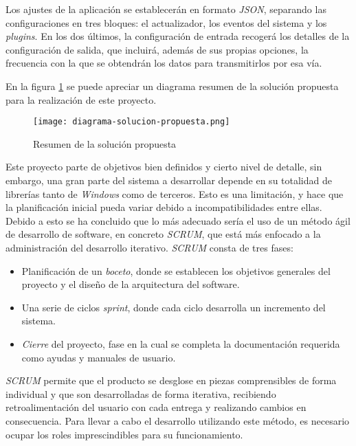     Los ajustes de la aplicación se establecerán en formato \textit{JSON}, separando las configuraciones en tres bloques: el actualizador, los eventos del sistema y los \textit{plugins}. En los dos últimos, la configuración de entrada recogerá los detalles de la configuración de salida, que incluirá, además de sus propias opciones, la frecuencia con la que se obtendrán los datos para transmitirlos por esa vía.
    
    En la figura \ref{fig:proposed-solution-diagram} se puede apreciar un diagrama resumen de la solución propuesta para la realización de este proyecto.
    
    \begin{figure}[h!]
    \centering
        \texttt{[image: diagrama-solucion-propuesta.png]}
        \caption{Resumen de la solución propuesta}
        \label{fig:proposed-solution-diagram}
    \end{figure}
    
    Este proyecto parte de objetivos bien definidos y cierto nivel de detalle, sin embargo, una gran parte del sistema a desarrollar depende en su totalidad de librerías tanto de \textit{Windows} como de terceros. Esto es una limitación, y hace que la planificación inicial pueda variar debido a incompatibilidades entre ellas. Debido a esto se ha concluido que lo más adecuado sería el uso de un método ágil de desarrollo de software, en concreto \textit{SCRUM}, que está más enfocado a la administración del desarrollo iterativo. \textit{SCRUM} consta de tres fases:
        
    \begin{itemize}
        \item Planificación de un \textit{boceto}, donde se establecen los objetivos generales del proyecto y el diseño de la arquitectura del software.
        
        \item Una serie de ciclos \textit{sprint}, donde cada ciclo desarrolla un incremento del sistema.
        
        \item \textit{Cierre} del proyecto, fase en la cual se completa la documentación requerida como ayudas y manuales de usuario.
    \end{itemize}

    \textit{SCRUM} permite que el producto se desglose en piezas comprensibles de forma individual y que son desarrolladas de forma iterativa, recibiendo retroalimentación del usuario con cada entrega y realizando cambios en consecuencia. Para llevar a cabo el desarrollo utilizando este método, es necesario ocupar los roles imprescindibles para su funcionamiento.

